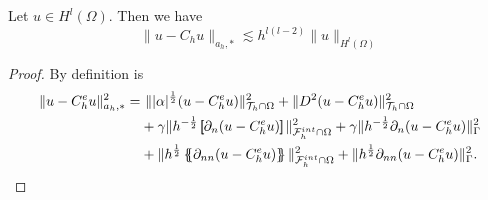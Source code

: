 \begin{lemma}
    Let $u \in H^{l}( \Omega ) $. Then we have  \[
    \|  u - C_{h}u \|_{ a_{h},*  }^{  } \lesssim h^{l(l-2)} \| u \|_{ H^{l}( \Omega )  }^{  }
    \]

\end{lemma}
\begin{proof}
    By definition is
    \[
        \begin{split}
            \| u - C_{h}^{e}u \|_{ a_{h}, * }^{  2}  =& \ \| |\alpha |^{\frac{1}{2}} ( u - C_{h}^{e}u) \|_{ \mathcal{T} _{h} \cap \Omega  }^{ 2}  + \| D^2 ( u - C_{h}^{e}u ) \|_{\mathcal{T} _{h} \cap \Omega   }^{ 2 } \\  &  + \gamma \| h^{-\frac{1}{2}} \jump{ \partial _{n} (u -
        C_{h}^{e} u) }   \|_{ \mathcal{F}_{h}^{int}\cap \Omega    }^{ 2
        } + \gamma \| h^{-\frac{1}{2}}  \partial _{n} (u - C_{h}^{e}u)    \|_{ \Gamma   }^{ 2 } \\
          & + \| h^{\frac{1}{2}} \mean{ \partial _{nn} (u - C_{h}^{e}u) }   \|_{\mathcal{F} _{h}^{int} \cap \Omega   }^{  2} +  \| h^{\frac{1}{2}} \partial _{nn}(u - C_{h}^{e}u)     \|_{ \Gamma }^{  2}.
        \end{split}
    \]


\end{proof}
